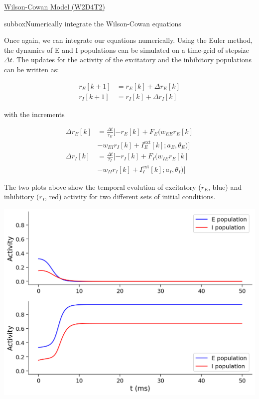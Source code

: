 \begin{textbox}{\href{https://compneuro.neuromatch.io/tutorials/W2D4_DynamicNetworks/chapter_title.html}{Wilson-Cowan Model (W2D4T2)} }
\begin{subbox}{subbox}{Numerically integrate the Wilson-Cowan equations}
\scriptsize

Once again, we can integrate our equations numerically. Using the Euler method, the dynamics of E and I populations can be simulated on a time-grid of stepsize $\Delta t$. The updates for the activity of the excitatory and the inhibitory populations can be written as:

\begin{align*}
r_E[k+1] &= r_E[k] + \Delta r_E[k]\\
r_I[k+1] &= r_I[k] + \Delta r_I[k] 
\end{align*}

with the increments

\begin{align*}
\Delta r_E[k] &= \frac{\Delta t}{\tau_E}[-r_E[k] + F_E(w_{EE}r_E[k] \\
&-w_{EI}r_I[k] + I^{\text{ext}}_E[k];a_E,\theta_E)]\\
\Delta r_I[k] &= \frac{\Delta t}{\tau_I}[-r_I[k] + F_I(w_{IE}r_E[k] \\
&-w_{II}r_I[k] + I^{\text{ext}}_I[k];a_I,\theta_I)] 
\end{align*}

The two plots above show the temporal evolution of excitatory ($r_E$, blue) and inhibitory ($r_I$, red) activity for two different sets of initial conditions.

\begin{center}
\includegraphics[scale=0.28]{Figures/DN/DN_Figure6.png}
\end{center}
\end{subbox}

\end{textbox}
